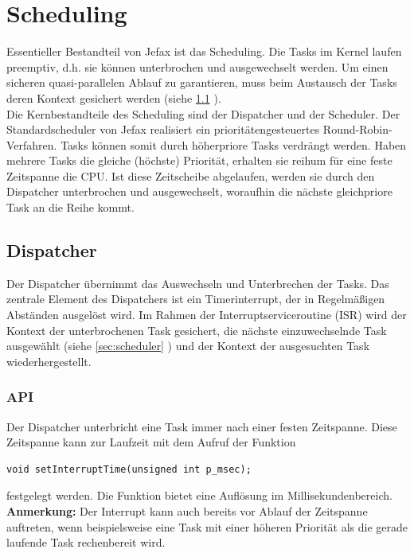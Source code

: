 \documentclass[fontsize=12pt, toc=bibliography, notitlepage]{scrreprt}
\newcommand{\refnn}[1]{\ref{#1} \nameref{#1}}
\begin{document}
\chapter{Scheduling}
\label{chap:scheduling}
Essentieller Bestandteil von Jefax ist das Scheduling. Die Tasks im Kernel laufen preemptiv, d.h. sie können unterbrochen und ausgewechselt werden. Um einen sicheren quasi-parallelen Ablauf zu garantieren, muss beim Austausch der Tasks deren Kontext gesichert werden (siehe \refnn{sec:dispatcher}).\\
Die Kernbestandteile des Scheduling sind der Dispatcher und der Scheduler. Der Standardscheduler von Jefax realisiert ein prioritätengesteuertes Round-Robin-Verfahren. Tasks können somit durch höherpriore Tasks verdrängt werden. Haben mehrere Tasks die gleiche (höchste) Priorität, erhalten sie reihum für eine feste Zeitspanne die CPU. Ist diese Zeitscheibe abgelaufen, werden sie durch den Dispatcher unterbrochen und ausgewechselt, woraufhin die nächste gleichpriore Task an die Reihe kommt.

\section{Dispatcher}
\label{sec:dispatcher}
Der Dispatcher übernimmt das Auswechseln und Unterbrechen der Tasks. Das zentrale Element des Dispatchers ist ein Timerinterrupt, der in Regelmäßigen Abständen ausgelöst wird. Im Rahmen der Interruptserviceroutine (ISR) wird der Kontext der unterbrochenen Task gesichert, die nächste einzuwechselnde Task ausgewählt (siehe \refnn{sec:scheduler}) und der Kontext der ausgesuchten Task wiederhergestellt. 

\subsection{API}
\label{subsec:dispatcher-api}
Der Dispatcher unterbricht eine Task immer nach einer festen Zeitspanne. Diese Zeitspanne kann zur Laufzeit mit dem Aufruf der Funktion 

\begin{lstlisting}[title=dispatcher.h]
void setInterruptTime(unsigned int p_msec);
\end{lstlisting}

festgelegt werden. Die Funktion bietet eine Auflösung im Millisekundenbereich.\\
\textbf{Anmerkung:} Der Interrupt kann auch bereits vor Ablauf der Zeitspanne auftreten, wenn beispielsweise eine Task mit einer höheren Priorität als die gerade laufende Task rechenbereit wird.
\end{document}
